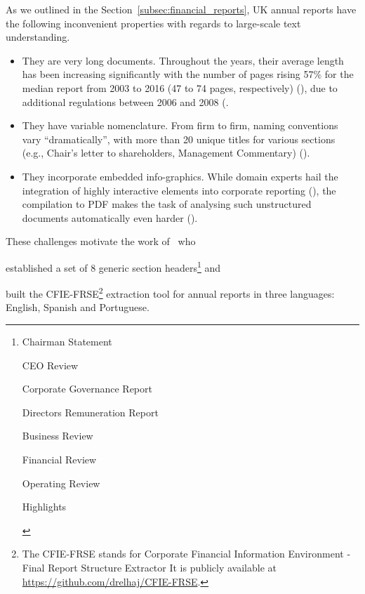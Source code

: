 As we outlined in the Section~\ref{subsec:financial_reports}, UK annual reports have the following inconvenient properties with regards to large-scale text understanding.
\begin{itemize}
    \item They are very long documents.
    Throughout the years, their average length has been increasing significantly with the number of pages rising 57\% for the median report from 2003 to 2016 (47 to 74 pages, respectively) (\cite{lewis_young_2019}), due to additional regulations between 2006 and 2008 (\cite{el-haj2019retrieving}.
    \item They have variable nomenclature.
    From firm to firm, naming conventions vary \enquote{dramatically}, with more than 20 unique titles for various sections (e.g., Chair's letter to shareholders, Management Commentary) (\cite{lewis_young_2019}).
    \item They incorporate embedded info-graphics.
    While domain experts hail the integration of highly interactive elements into corporate reporting (\cite{kriz2016future}), the compilation to PDF makes the task of analysing such unstructured documents automatically even harder (\cite{lewis_young_2019}).
\end{itemize}

These challenges motivate the work of~\cite{elhaj2019multilingual} who \begin{enumerate*}[label=(\alph*)]
    \item established a set of 8 generic section headers\footnote{
        \begin{enumerate*}
            \item Chairman Statement
            \item CEO Review
            \item Corporate Governance Report
            \item Directors Remuneration Report
            \item Business Review
            \item Financial Review
            \item Operating Review
            \item Highlights
        \end{enumerate*}
    } and
    \item built the CFIE-FRSE\footnote{
        The CFIE-FRSE stands for Corporate Financial Information Environment - Final Report Structure Extractor
        It is publicly available at \url{https://github.com/drelhaj/CFIE-FRSE}.
    } extraction tool for annual reports in three languages: English, Spanish and Portuguese.
\end{enumerate*}




